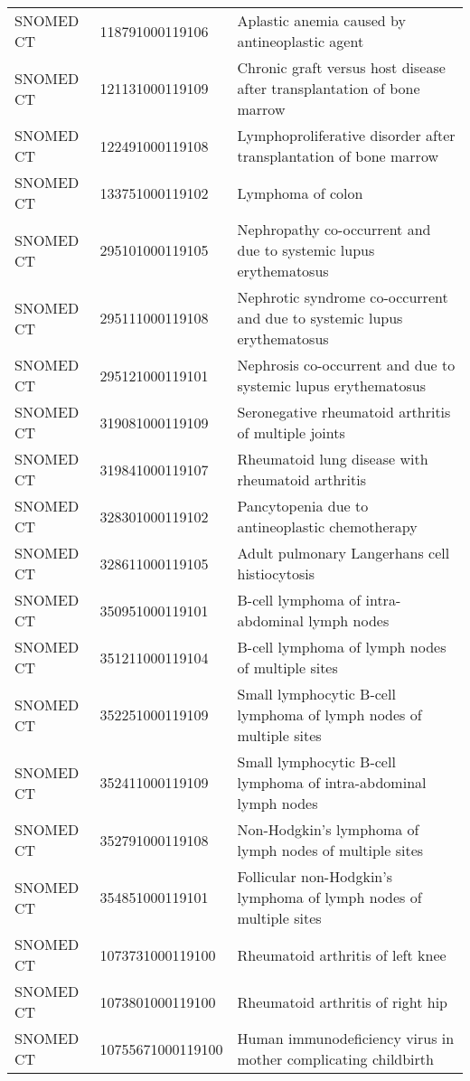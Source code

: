 \begin{longtable}{p{}p{}p{}}
  SNOMED CT & 118791000119106 & Aplastic anemia caused by antineoplastic agent \\ 
  SNOMED CT & 121131000119109 & Chronic graft versus host disease after transplantation of bone marrow \\ 
  SNOMED CT & 122491000119108 & Lymphoproliferative disorder after transplantation of bone marrow \\ 
  SNOMED CT & 133751000119102 & Lymphoma of colon \\ 
  SNOMED CT & 295101000119105 & Nephropathy co-occurrent and due to systemic lupus erythematosus \\ 
  SNOMED CT & 295111000119108 & Nephrotic syndrome co-occurrent and due to systemic lupus erythematosus \\ 
  SNOMED CT & 295121000119101 & Nephrosis co-occurrent and due to systemic lupus erythematosus \\ 
  SNOMED CT & 319081000119109 & Seronegative rheumatoid arthritis of multiple joints \\ 
  SNOMED CT & 319841000119107 & Rheumatoid lung disease with rheumatoid arthritis \\ 
  SNOMED CT & 328301000119102 & Pancytopenia due to antineoplastic chemotherapy \\ 
  SNOMED CT & 328611000119105 & Adult pulmonary Langerhans cell histiocytosis \\ 
  SNOMED CT & 350951000119101 & B-cell lymphoma of intra-abdominal lymph nodes \\ 
  SNOMED CT & 351211000119104 & B-cell lymphoma of lymph nodes of multiple sites \\ 
  SNOMED CT & 352251000119109 & Small lymphocytic B-cell lymphoma of lymph nodes of multiple sites \\ 
  SNOMED CT & 352411000119109 & Small lymphocytic B-cell lymphoma of intra-abdominal lymph nodes \\ 
  SNOMED CT & 352791000119108 & Non-Hodgkin's lymphoma of lymph nodes of multiple sites \\ 
  SNOMED CT & 354851000119101 & Follicular non-Hodgkin's lymphoma of lymph nodes of multiple sites \\ 
  SNOMED CT & 1073731000119100 & Rheumatoid arthritis of left knee \\ 
  SNOMED CT & 1073801000119100 & Rheumatoid arthritis of right hip \\ 
  SNOMED CT & 10755671000119100 & Human immunodeficiency virus in mother complicating childbirth \\ 

\end{longtable}
